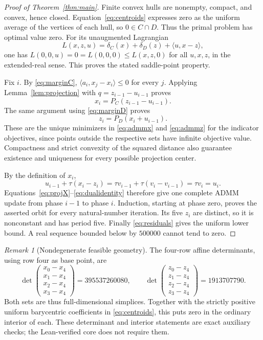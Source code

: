 \documentclass[11pt,a4paper]{article}
\theoremstyle{remark}
\newtheorem{remark}[theorem]{Remark}
\newcommand{\ip}[2]{\langle #1,#2\rangle}
\begin{document}
\begin{proof}[Proof of Theorem~\ref{thm:main}]
Finite convex hulls are nonempty, compact, and convex, hence closed. Equation~\eqref{eq:centroids} expresses zero as the uniform average of the vertices of each hull, so $0\in C\cap D$. Thus the primal problem has optimal value zero. For its unaugmented Lagrangian
\[
L(x,z,u)=\delta_C(x)+\delta_D(z)+\ip{u}{x-z},
\]
one has $L(0,0,u)=0=L(0,0,0)\le L(x,z,0)$ for all $u,x,z$, in the extended-real sense. This proves the stated saddle-point property.

Fix $i$. By \eqref{eq:marginC}, $\ip{a_i}{x_j-x_i}\le0$ for every $j$. Applying Lemma~\ref{lem:projection} with $q=z_{i-1}-u_{i-1}$ proves
\begin{equation}\label{eq:projX}
x_i=P_C(z_{i-1}-u_{i-1}).
\end{equation}
The same argument using \eqref{eq:marginD} proves
\begin{equation}\label{eq:projZ}
z_i=P_D(x_i+u_{i-1}).
\end{equation}
These are the unique minimizers in \eqref{eq:admmx} and \eqref{eq:admmz} for the indicator objectives, since points outside the respective sets have infinite objective value. Compactness and strict convexity of the squared distance also guarantee existence and uniqueness for every possible projection center.

By the definition of $x_i$,
\begin{equation}\label{eq:dualidentity}
u_{i-1}+\tau(x_i-z_i)
=\tau v_{i-1}+\tau(v_i-v_{i-1})
=\tau v_i=u_i.
\end{equation}
Equations~\eqref{eq:projX}--\eqref{eq:dualidentity} therefore give one complete ADMM update from phase $i-1$ to phase $i$. Induction, starting at phase zero, proves the asserted orbit for every natural-number iteration. Its five $z_i$ are distinct, so it is nonconstant and has period five. Finally \eqref{eq:residuals} gives the uniform lower bound. A real sequence bounded below by $500000$ cannot tend to zero.
\end{proof}

\begin{remark}[Nondegenerate feasible geometry]
The four-row affine determinants, using row four as base point, are
\[
\det\begin{pmatrix}x_0-x_4\\x_1-x_4\\x_2-x_4\\x_3-x_4\end{pmatrix}=395537260080,
\qquad
\det\begin{pmatrix}z_0-z_4\\z_1-z_4\\z_2-z_4\\z_3-z_4\end{pmatrix}=1913707790.
\]
Both sets are thus full-dimensional simplices. Together with the strictly positive uniform barycentric coefficients in \eqref{eq:centroids}, this puts zero in the ordinary interior of each. These determinant and interior statements are exact auxiliary checks; the Lean-verified core does not require them.
\end{remark}
\end{document}
